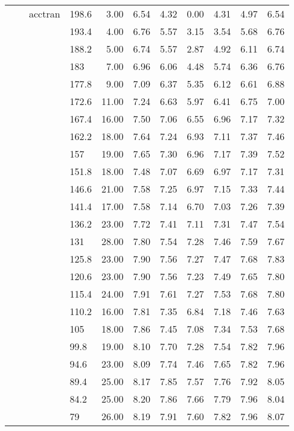 \begin{longtable}{llllrrrrrrr}
   &  & acctran & 198.6 & 3.00 & 6.54 & 4.32 & 0.00 & 4.31 & 4.97 & 6.54 \\ 
   &  &  & 193.4 & 4.00 & 6.76 & 5.57 & 3.15 & 3.54 & 5.68 & 6.76 \\ 
   &  &  & 188.2 & 5.00 & 6.74 & 5.57 & 2.87 & 4.92 & 6.11 & 6.74 \\ 
   &  &  & 183 & 7.00 & 6.96 & 6.06 & 4.48 & 5.74 & 6.36 & 6.76 \\ 
   &  &  & 177.8 & 9.00 & 7.09 & 6.37 & 5.35 & 6.12 & 6.61 & 6.88 \\ 
   &  &  & 172.6 & 11.00 & 7.24 & 6.63 & 5.97 & 6.41 & 6.75 & 7.00 \\ 
   &  &  & 167.4 & 16.00 & 7.50 & 7.06 & 6.55 & 6.96 & 7.17 & 7.32 \\ 
   &  &  & 162.2 & 18.00 & 7.64 & 7.24 & 6.93 & 7.11 & 7.37 & 7.46 \\ 
   &  &  & 157 & 19.00 & 7.65 & 7.30 & 6.96 & 7.17 & 7.39 & 7.52 \\ 
   &  &  & 151.8 & 18.00 & 7.48 & 7.07 & 6.69 & 6.97 & 7.17 & 7.31 \\ 
   &  &  & 146.6 & 21.00 & 7.58 & 7.25 & 6.97 & 7.15 & 7.33 & 7.44 \\ 
   &  &  & 141.4 & 17.00 & 7.58 & 7.14 & 6.70 & 7.03 & 7.26 & 7.39 \\ 
   &  &  & 136.2 & 23.00 & 7.72 & 7.41 & 7.11 & 7.31 & 7.47 & 7.54 \\ 
   &  &  & 131 & 28.00 & 7.80 & 7.54 & 7.28 & 7.46 & 7.59 & 7.67 \\ 
   &  &  & 125.8 & 23.00 & 7.90 & 7.56 & 7.27 & 7.47 & 7.68 & 7.83 \\ 
   &  &  & 120.6 & 23.00 & 7.90 & 7.56 & 7.23 & 7.49 & 7.65 & 7.80 \\ 
   &  &  & 115.4 & 24.00 & 7.91 & 7.61 & 7.27 & 7.53 & 7.68 & 7.80 \\ 
   &  &  & 110.2 & 16.00 & 7.81 & 7.35 & 6.84 & 7.18 & 7.46 & 7.63 \\ 
   &  &  & 105 & 18.00 & 7.86 & 7.45 & 7.08 & 7.34 & 7.53 & 7.68 \\ 
   &  &  & 99.8 & 19.00 & 8.10 & 7.70 & 7.28 & 7.54 & 7.82 & 7.96 \\ 
   &  &  & 94.6 & 23.00 & 8.09 & 7.74 & 7.46 & 7.65 & 7.82 & 7.96 \\ 
   &  &  & 89.4 & 25.00 & 8.17 & 7.85 & 7.57 & 7.76 & 7.92 & 8.05 \\ 
   &  &  & 84.2 & 25.00 & 8.20 & 7.86 & 7.66 & 7.79 & 7.96 & 8.04 \\ 
   &  &  & 79 & 26.00 & 8.19 & 7.91 & 7.60 & 7.82 & 7.96 & 8.07 \\ 

\end{longtable}
